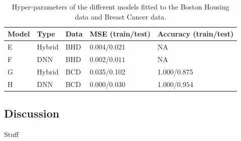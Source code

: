\begin{table}[H]
\centering
\begin{tabular}{|l|l|l|l|l|}
\hline
Model& Type& Data& MSE (train/test) & Accuracy (train/test) \\ \hline
E    & Hybrid & BHD  & 0.004/0.021 & NA    \\ \hline
F    & DNN & BHD     & 0.002/$\boldsymbol{0.011}$  & NA  \\ \Xhline{2\arrayrulewidth}
G    & Hybrid & BCD        & 0.035/0.102  & 1.000/0.875    \\ \hline
H    & DNN & BCD           & 0.000/$\boldsymbol{0.030}$  & 1.000/$\boldsymbol{0.954}$  \\ \hline
\end{tabular}
\caption{Hyper-parameters of the different models fitted to the Boston Housing data and Breast Cancer data.} 
\label{tab:results PCA}
\end{table}



\subsection{Discussion}\label{sec:Boston Housing Data Discussion}
Stuff


